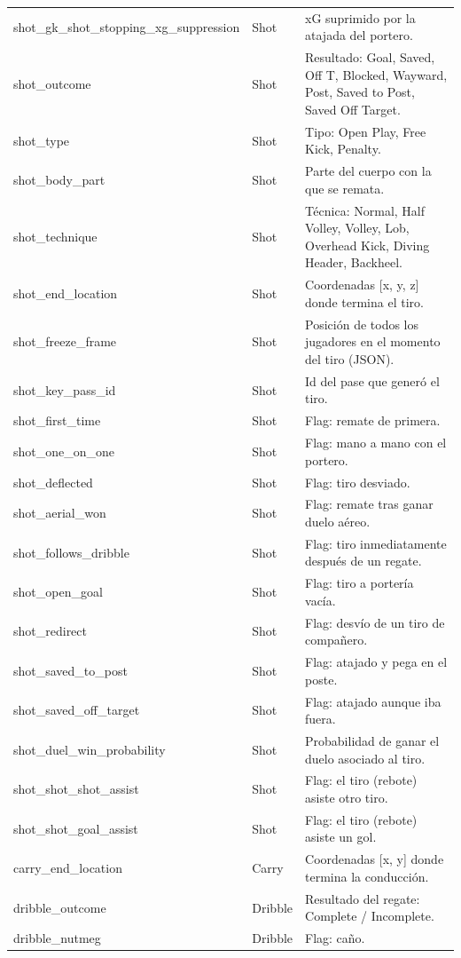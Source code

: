 {\begin{longtable}{p{4.3cm}p{2.2cm}p{8.8cm}}
shot\_gk\_shot\_stopping\_xg\_suppression & Shot & xG suprimido por la atajada del portero. \\
shot\_outcome & Shot & Resultado: Goal, Saved, Off T, Blocked, Wayward, Post, Saved to Post, Saved Off Target. \\
shot\_type & Shot & Tipo: Open Play, Free Kick, Penalty. \\
shot\_body\_part & Shot & Parte del cuerpo con la que se remata. \\
shot\_technique & Shot & Técnica: Normal, Half Volley, Volley, Lob, Overhead Kick, Diving Header, Backheel. \\
shot\_end\_location & Shot & Coordenadas [x, y, z] donde termina el tiro. \\
shot\_freeze\_frame & Shot & Posición de todos los jugadores en el momento del tiro (JSON). \\
shot\_key\_pass\_id & Shot & Id del pase que generó el tiro. \\
shot\_first\_time & Shot & Flag: remate de primera. \\
shot\_one\_on\_one & Shot & Flag: mano a mano con el portero. \\
shot\_deflected & Shot & Flag: tiro desviado. \\
shot\_aerial\_won & Shot & Flag: remate tras ganar duelo aéreo. \\
shot\_follows\_dribble & Shot & Flag: tiro inmediatamente después de un regate. \\
shot\_open\_goal & Shot & Flag: tiro a portería vacía. \\
shot\_redirect & Shot & Flag: desvío de un tiro de compañero. \\
shot\_saved\_to\_post & Shot & Flag: atajado y pega en el poste. \\
shot\_saved\_off\_target & Shot & Flag: atajado aunque iba fuera. \\
shot\_duel\_win\_probability & Shot & Probabilidad de ganar el duelo asociado al tiro. \\
shot\_shot\_shot\_assist & Shot & Flag: el tiro (rebote) asiste otro tiro. \\
shot\_shot\_goal\_assist & Shot & Flag: el tiro (rebote) asiste un gol. \\
carry\_end\_location & Carry & Coordenadas [x, y] donde termina la conducción. \\
dribble\_outcome & Dribble & Resultado del regate: Complete / Incomplete. \\
dribble\_nutmeg & Dribble & Flag: caño. \\

\end{longtable}}
